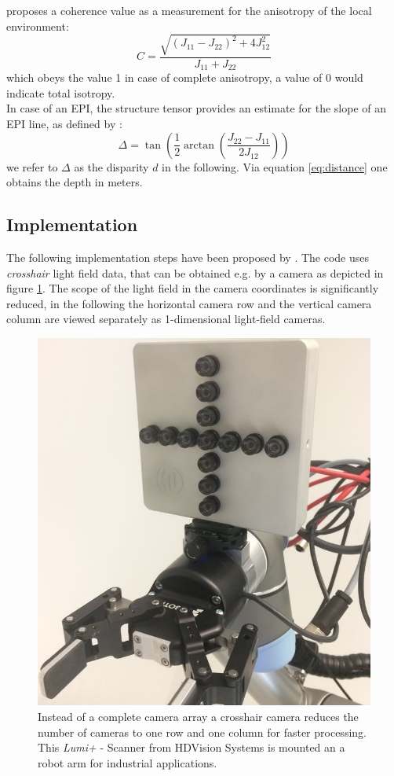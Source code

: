 \documentclass  [
  paper    = a4,
  BCOR     = 10mm,
  twoside,
  fontsize = 12pt,
  fleqn,
  toc      = bibnumbered,
  toc      = listofnumbered,
  numbers  = noendperiod,
  headings = normal,
  listof   = leveldown,
  version  = 3.03
]                                       {scrreprt}
\begin{document}
   \cite{jahne2013digitale} proposes a coherence value as a measurement for the anisotropy of the local environment:
 \begin{equation}\label{eq:coherence}
 C = \frac{\sqrt{(J_{11} - J_{22})^2 + 4J_{12}^2}}{J_{11} + J_{22}}
 \end{equation}
 which obeys the value 1 in case of complete anisotropy, a value of 0 would indicate total isotropy.\\
 In case of an EPI, the structure tensor provides an estimate for the slope of an EPI line, as defined by \cite{bigun1987optimal}:
 \begin{equation}\label{eq:disparity}
 \Delta = \tan\left(\frac{1}{2} \arctan\left( \frac{J_{22}-J_{11}}{2J_{12}}\right)\right)
 \end{equation}
 we refer to $\Delta$ as the disparity $d$ in the following. Via equation \ref{eq:distance} one obtains the depth in meters.
 
 \subsection{Implementation}
 The following implementation steps have been proposed by \cite{wanner2014orientation}. The code uses \textit{crosshair} light field data, that can be obtained e.g. by a camera as depicted in figure \ref{fig:lumiplus}. The scope of the light field in the camera coordinates is significantly reduced, in the following the horizontal camera row and the vertical camera column are viewed separately as 1-dimensional light-field cameras.\\
 \begin{figure}[]
 	\centering
 	\includegraphics[width=0.7\linewidth]{images/Lumiplus}
 	\caption[LumiPlus Scanner from HDVision Systems]{Instead of a complete camera array a crosshair camera reduces the number of cameras to one row and one column for faster processing. This \textit{Lumi+} - Scanner from HDVision Systems is mounted an a robot arm for industrial applications.}
 	\label{fig:lumiplus}
 \end{figure}
 
\end{document}
